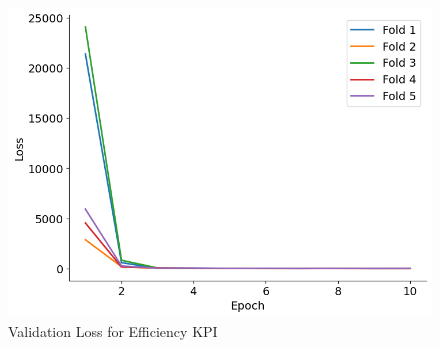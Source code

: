 \documentclass{report} %
\begin{document}
\begin{figure}[H]
\begin{minipage}[b]{0.325\textwidth}
        \includegraphics[width=\textwidth]{./ReportImages/val_loss_y2.png}
        \caption{\centering Validation Loss for Efficiency \ac{KPI}}
        \label{fig:Validation Loss for Efficiency grid}
    \end{minipage}
\end{figure}
\end{document}
